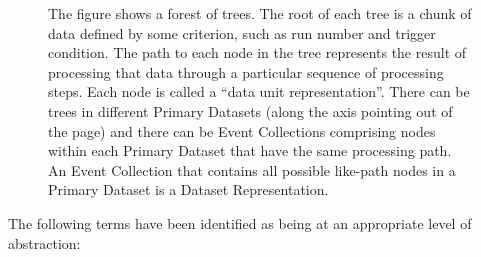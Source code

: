 \documentclass{cmspaper}
\begin{document}
\begin{figure}[hbtp]
  \begin{center}
    \caption{The figure shows a forest of trees.  The root of each tree is a 
chunk of data defined by some criterion, such as run number and trigger condition.
The path to each node in the tree represents the result of processing that 
data through a particular sequence of processing steps.  Each node is called 
a ``data unit representation''.  There can be trees in different Primary Datasets (along the 
axis pointing out of the page) and there can be Event Collections comprising nodes 
within each Primary Dataset that have the same processing path. An Event Collection 
that contains all possible like-path nodes in a Primary Dataset is a Dataset 
Representation.}
    \label{fig:forest}
  \end{center}
\end{figure}

The following terms have been identified as being at an appropriate level 
of abstraction:
\end{document}
